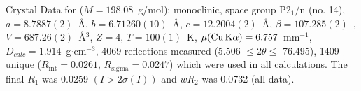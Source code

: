 \documentclass{minimal}
\begin{document}
Crystal Data for  (\(M = 198.08\)~g/mol): monoclinic, space group \(\mathrm{P2_{1}/n}\) (no. 14), \( a = 8.7887(2)\)~\AA{}, \( b = 6.71260(10)\)~\AA{}, \( c = 12.2004(2)\)~\AA{}, \( \beta = 107.285(2)\)~\degree{}, \( V = 687.26(2) \)~\AA{}\(^3\), \( Z = 4 \), \( T = 100(1)\)~K, \( \mu ( \ce{Cu K\alpha} ) = 6.757\)~mm\(^{-1}\), \( D_{calc} = 1.914\)~g\(\cdot\)cm\(^{-3}\), 4069 reflections measured (5.506\degree{} \(\leq 2\theta \leq\) 76.495\degree{}), 1409 unique (\(R_{\mathrm{int}} = 0.0261 \), \(R_{\mathrm{sigma}} = 0.0247 \)) which were used in all calculations. The final \(R_1\) was 0.0259 \( (I > 2\sigma(I)) \) and \(wR_2\) was 0.0732 (all data).
\end{document}
